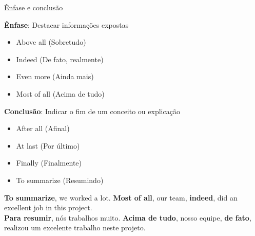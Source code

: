 \documentclass[compress,mathserif,xcolor=table]{beamer}
\begin{document}

\begin{frame}{Ênfase e conclusão}

\textbf{Ênfase}: Destacar informações expostas

\vspace{0.15cm}

\begin{minipage}{.49\textwidth}
\begin{itemize}
    \item Above all (Sobretudo)
    \item Indeed (De fato, realmente)
\end{itemize}
\end{minipage}
\begin{minipage}{.49\textwidth}
\begin{itemize}
    \item Even more (Ainda mais)
    \item Most of all (Acima de tudo)
\end{itemize}
\end{minipage}

\vspace{0.5cm}

\textbf{Conclusão}: Indicar o fim de um conceito ou explicação

\vspace{0.15cm}

\begin{minipage}{.49\textwidth}
\begin{itemize}
    \item After all (Afinal)
    \item At last (Por último)
\end{itemize}
\end{minipage}
\begin{minipage}{.49\textwidth}
\begin{itemize}
    \item Finally (Finalmente)
    \item To summarize (Resumindo)
\end{itemize}
\end{minipage}

\vspace{0.5cm}

\textbf{To summarize}, we worked a lot. \textbf{Most of all}, our team, \textbf{indeed}, did an excellent job in this project.
 \\
\vspace{0.15cm}
\textbf{Para resumir}, nós trabalhos muito. \textbf{Acima de tudo}, nosso equipe, \textbf{de fato}, realizou um excelente trabalho neste projeto.

\end{frame}
\end{document}
